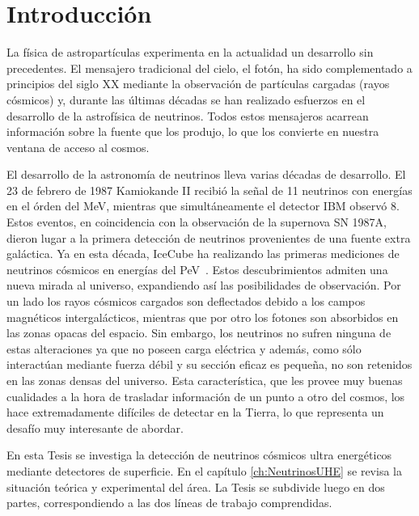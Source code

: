 \chapter{Introducci\'on}
\label{ch:intro}

La f\'isica de astropart\'iculas experimenta en la actualidad un desarrollo sin precedentes. 
El mensajero tradicional del cielo, el fot\'on, ha sido complementado a principios del siglo XX mediante la observaci\'on de part\'iculas cargadas (rayos c\'osmicos) y, durante las \'ultimas d\'ecadas se han realizado esfuerzos en el desarrollo de la astrof\'isica de neutrinos.
Todos estos mensajeros acarrean informaci\'on sobre la fuente que los produjo, lo que los convierte en nuestra ventana de acceso al cosmos.

El desarrollo de la astronom\'ia de neutrinos lleva varias d\'ecadas de desarrollo. 
El 23 de febrero de 1987 Kamiokande II recibi\'o la se\~nal de 11 neutrinos con energ\'ias en el \'orden del MeV, mientras que simult\'aneamente el detector IBM observ\'o 8.
Estos eventos, en coincidencia con la observaci\'on de la supernova SN 1987A, dieron lugar a la primera detecci\'on de neutrinos provenientes de una fuente extra gal\'actica.
Ya en esta d\'ecada, IceCube ha realizando las primeras mediciones de neutrinos c\'osmicos en energ\'ias del PeV~\cite{cite:IceCube1}.
Estos descubrimientos admiten una nueva mirada al universo, expandiendo as\'i las posibilidades de observaci\'on.
Por un lado los rayos c\'osmicos cargados son deflectados debido a los campos magn\'eticos intergal\'acticos, mientras que por otro los fotones son absorbidos en las zonas opacas del espacio. 
Sin embargo, los neutrinos no sufren ninguna de estas alteraciones ya que no poseen carga el\'ectrica y adem\'as, como s\'olo interact\'uan mediante fuerza d\'ebil y su secci\'on eficaz es peque\~na, no son retenidos en las zonas densas del universo.
Esta caracter\'istica, que les provee muy buenas cualidades a la hora de trasladar informaci\'on de un punto a otro del cosmos, los hace extremadamente dif\'iciles de detectar en la Tierra, lo que representa un desaf\'io muy interesante de abordar.

En esta Tesis se investiga la detecci\'on de neutrinos c\'osmicos ultra energ\'eticos mediante detectores de superficie.  En el cap\'itulo \ref{ch:NeutrinosUHE} se revisa la situaci\'on te\'orica y experimental del \'area. La Tesis se subdivide luego en dos partes, correspondiendo a las dos líneas de trabajo comprendidas.

